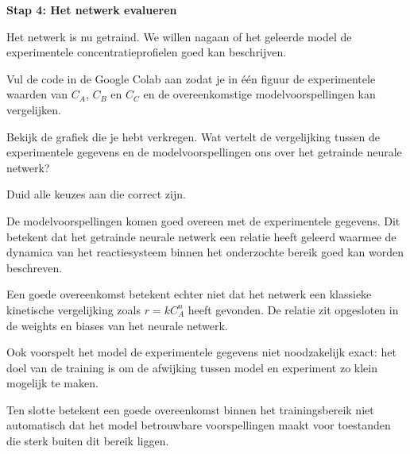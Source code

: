 \documentclass{ximera}
\begin{document}
\begin{question} \textbf{Stap 4: Het netwerk evalueren}

Het netwerk is nu getraind. We willen nagaan of het geleerde model de experimentele concentratieprofielen goed kan beschrijven.

Vul de code in de Google Colab aan zodat je in één figuur de experimentele waarden van $C_A$, $C_B$ en $C_C$ en de overeenkomstige modelvoorspellingen
kan vergelijken.

Bekijk de grafiek die je hebt verkregen. Wat vertelt de vergelijking tussen de experimentele gegevens en de modelvoorspellingen ons over het getrainde neurale netwerk?

Duid alle keuzes aan die correct zijn.
\begin{multipleChoice}



\end{multipleChoice}

\begin{feedback} \text{ }

De modelvoorspellingen komen goed overeen met de experimentele gegevens. Dit betekent dat het getrainde neurale netwerk een relatie heeft geleerd waarmee de dynamica van het reactiesysteem binnen het onderzochte bereik goed kan worden beschreven.

Een goede overeenkomst betekent echter niet dat het netwerk een klassieke kinetische vergelijking zoals $r=kC_A^n$ heeft gevonden. De relatie zit opgesloten in de weights en biases van het neurale netwerk.

Ook voorspelt het model de experimentele gegevens niet noodzakelijk exact: het doel van de training is om de afwijking tussen model en experiment zo klein mogelijk te maken. 

Ten slotte betekent een goede overeenkomst binnen het trainingsbereik niet automatisch dat het model betrouwbare voorspellingen maakt voor toestanden die sterk buiten dit bereik liggen.
\end{feedback}
\end{question}
\end{document}
